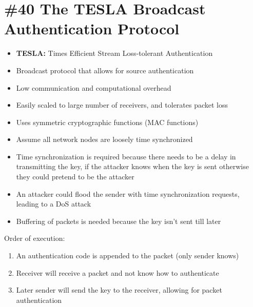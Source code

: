 \section{\#40 The TESLA Broadcast Authentication Protocol}
\begin{itemize}
	\item \textbf{TESLA:} Times Efficient Stream Loss-tolerant Authentication
	\item Broadcast protocol that allows for source authentication
	\item Low communication and computational overhead
	\item Easily scaled to large number of receivers, and tolerates packet loss
	\item Uses symmetric  cryptographic functions (MAC functions)
	\item Assume all network nodes are loosely time synchronized
	\item Time synchronization is required because there needs to be a delay in transmitting the key, if the attacker knows when the key is sent otherwise they could pretend to be the attacker
	\item An attacker could flood the sender with time synchronization requests, leading to a DoS attack
	\item Buffering of packets is needed because the key isn't sent till later
\end{itemize}
Order of execution:
\begin{enumerate}
	\item An authentication code is appended to the packet (only sender knows)
	\item Receiver will receive a packet and not know how to authenticate
	\item Later sender will send the key to the receiver, allowing for packet authentication
\end{enumerate}